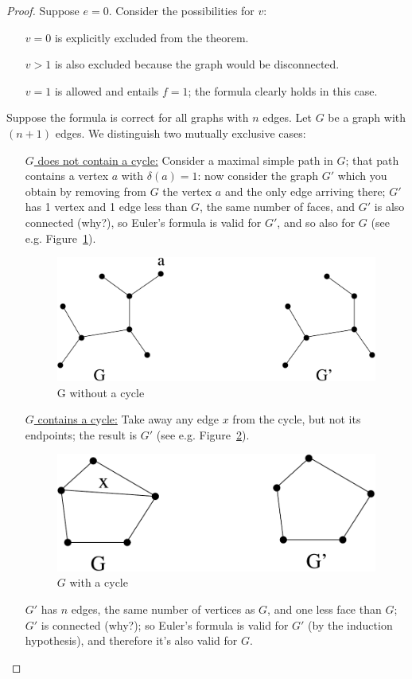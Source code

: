 \begin{proof}

{
Suppose
$e=0$. Consider the possibilities for $v$: 
\begin{itemize}
\item[$v = 0$] is explicitly excluded from the theorem.
\item[$v > 1$] is also excluded because the graph would be disconnected. 
\item[$v=1$] is allowed and entails $f = 1$; the formula clearly holds in this case.
\end{itemize}
}
{
Suppose the formula is
correct for all graphs with $n$ edges. Let $G$ be a graph with $(n+1)$
edges. We distinguish two mutually exclusive cases:
\begin{itemize}
	\item[\underline{$G$ does not contain a c}y\underline{cle:}]
	Consider a maximal
	simple path in $G$; that path contains a vertex $a$ with $\delta(a) =
	1$: now consider the graph $G'$ which you obtain by removing from $G$
	the vertex $a$ and the only edge arriving there; $G'$ has 1 vertex
	and 1 edge less than $G$, the same number of faces, and $G'$ is also
	connected (why?), so Euler's formula is valid for $G'$, and
	so also for $G$ (see e.g. Figure~\ref{euler2}).\\
	\begin{figure}[ht]
		\centering
		\includegraphics[width=0.4\linewidth,keepaspectratio]{euler2}
		\caption{G without a cycle \label{euler2}}
	\end{figure}
	
	\item[\underline{$G$ contains a c}y\underline{cle:}]
	Take away any edge $x$ from
	the cycle, but not its endpoints; the result is $G'$ (see
	e.g. Figure~\ref{euler3}).
	\begin{figure}[ht]
		\centering
		\includegraphics[width=0.4\linewidth,keepaspectratio]{euler3}
		\caption{$G$ with a cycle \label{euler3}}
	\end{figure}
	$G'$ has $n$ edges, the same number of vertices as $G$, and one less
	face than $G$; $G'$ is connected (why?); so Euler's formula is valid
	for $G'$ (by the induction hypothesis), and therefore it's also valid for $G$.
\end{itemize}
}
\end{proof}

